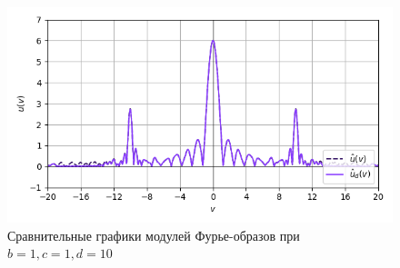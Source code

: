 \documentclass[a4paper]{article}
\begin{document}
\begin{figure}[H]
\begin{minipage}{0.33\textwidth}
        \centering \includegraphics[width=\textwidth]{sources/band-stop filter/fourier (b=1, c=1, d=10, v=16).png}
        \caption{$v = 16$}
    \end{minipage}
    \caption*{Сравнительные графики модулей Фурье-образов при $b=1, c=1, d=10$}
\end{figure}
\end{document}
